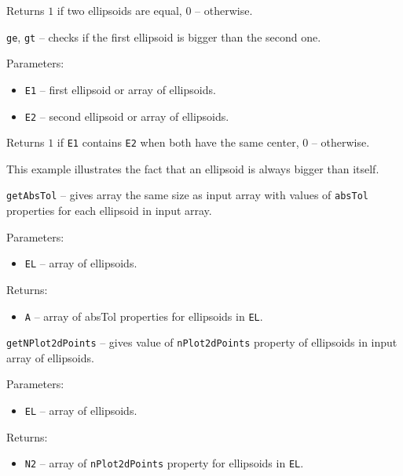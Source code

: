 Returns $1$ if two ellipsoids are equal, $0$ -- otherwise.



\newpage

{\Large {\tt ge}}, {\Large {\tt gt}} -- checks if the first ellipsoid is bigger
than the second one.

Parameters:
\begin{itemize}
\item {\tt E1} -- first ellipsoid or array of ellipsoids.
\item {\tt E2} -- second ellipsoid or array of ellipsoids.
\end{itemize}

Returns $1$ if {\tt E1} contains {\tt E2} when both have the same center,
$0$ -- otherwise.


This example illustrates the fact that an ellipsoid is always bigger than itself.

\newpage
{\Large {\tt getAbsTol}} -- gives array the same size as input array with values of {\tt absTol} properties for each ellipsoid in input array.

Parameters:
\begin{itemize}
\item {\tt EL} -- array of ellipsoids.
\end{itemize}

Returns:
\begin{itemize}
\item {\tt A} -- array of absTol
properties for ellipsoids in {\tt EL}.
\end{itemize}

\newpage

{\Large {\tt getNPlot2dPoints}} -- gives value of {\tt nPlot2dPoints} property
of ellipsoids in input array of ellipsoids.

Parameters:
\begin{itemize}
\item {\tt EL} -- array of ellipsoids.
\end{itemize}

Returns:
\begin{itemize}
\item {\tt N2} -- array of {\tt nPlot2dPoints} property for ellipsoids
 in {\tt EL}.
\end{itemize}

\newpage


